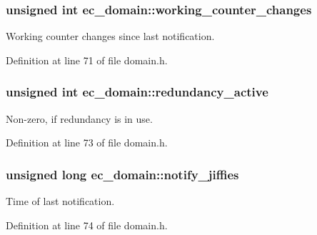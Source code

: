 \subsubsection[{working\-\_\-counter\-\_\-changes}]{\setlength{\rightskip}{0pt plus 5cm}unsigned int {\bf ec\-\_\-domain\-::working\-\_\-counter\-\_\-changes}}\label{structec__domain_abe70425a9c3e701f4b561d0baac2e29c}


\-Working counter changes since last notification. 



\-Definition at line 71 of file domain.\-h.

\subsubsection[{redundancy\-\_\-active}]{\setlength{\rightskip}{0pt plus 5cm}unsigned int {\bf ec\-\_\-domain\-::redundancy\-\_\-active}}\label{structec__domain_aeb8f64931c44dc2c89521b94f54879d6}


\-Non-\/zero, if redundancy is in use. 



\-Definition at line 73 of file domain.\-h.

\subsubsection[{notify\-\_\-jiffies}]{\setlength{\rightskip}{0pt plus 5cm}unsigned long {\bf ec\-\_\-domain\-::notify\-\_\-jiffies}}\label{structec__domain_a5d14409ef398792e134f5b4f170a9f5c}


\-Time of last notification. 



\-Definition at line 74 of file domain.\-h.


